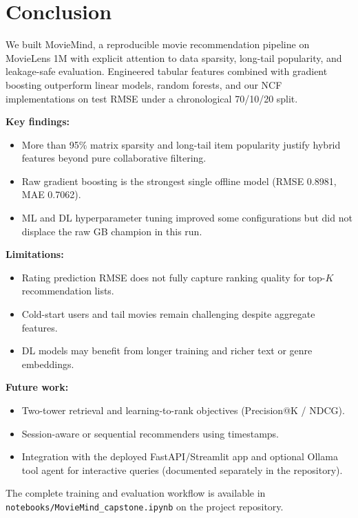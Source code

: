 \section{Conclusion}

We built MovieMind, a reproducible movie recommendation pipeline on MovieLens 1M with explicit attention to
data sparsity, long-tail popularity, and leakage-safe evaluation.
Engineered tabular features combined with gradient boosting outperform linear models, random forests, and
our NCF implementations on test RMSE under a chronological 70/10/20 split.

\textbf{Key findings:}
\begin{itemize}
  \item More than 95\% matrix sparsity and long-tail item popularity justify hybrid features beyond pure
        collaborative filtering.
  \item Raw gradient boosting is the strongest single offline model (RMSE 0.8981, MAE 0.7062).
  \item ML and DL hyperparameter tuning improved some configurations but did not displace the raw GB
        champion in this run.
\end{itemize}

\textbf{Limitations:}
\begin{itemize}
  \item Rating prediction RMSE does not fully capture ranking quality for top-$K$ recommendation lists.
  \item Cold-start users and tail movies remain challenging despite aggregate features.
  \item DL models may benefit from longer training and richer text or genre embeddings.
\end{itemize}

\textbf{Future work:}
\begin{itemize}
  \item Two-tower retrieval and learning-to-rank objectives (Precision@K / NDCG).
  \item Session-aware or sequential recommenders using timestamps.
  \item Integration with the deployed FastAPI/Streamlit app and optional Ollama tool agent for interactive
        queries (documented separately in the repository).
\end{itemize}

The complete training and evaluation workflow is available in
\texttt{notebooks/MovieMind\_capstone.ipynb} on the project repository.
